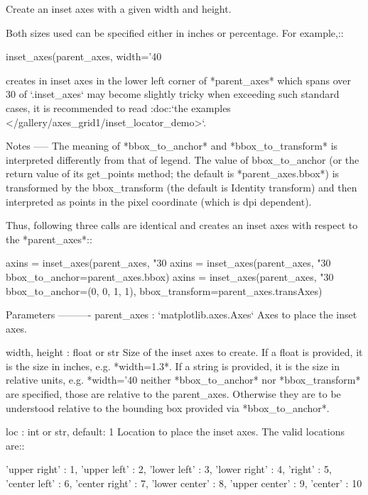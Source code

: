 \begin{DoxyVerb}Create an inset axes with a given width and height.

Both sizes used can be specified either in inches or percentage.
For example,::

    inset_axes(parent_axes, width='40%

creates in inset axes in the lower left corner of *parent_axes* which spans
over 30%
of `.inset_axes` may become slightly tricky when exceeding such standard
cases, it is recommended to read :doc:`the examples
</gallery/axes_grid1/inset_locator_demo>`.

Notes
-----
The meaning of *bbox_to_anchor* and *bbox_to_transform* is interpreted
differently from that of legend. The value of bbox_to_anchor
(or the return value of its get_points method; the default is
*parent_axes.bbox*) is transformed by the bbox_transform (the default
is Identity transform) and then interpreted as points in the pixel
coordinate (which is dpi dependent).

Thus, following three calls are identical and creates an inset axes
with respect to the *parent_axes*::

   axins = inset_axes(parent_axes, "30%
   axins = inset_axes(parent_axes, "30%
                      bbox_to_anchor=parent_axes.bbox)
   axins = inset_axes(parent_axes, "30%
                      bbox_to_anchor=(0, 0, 1, 1),
                      bbox_transform=parent_axes.transAxes)

Parameters
----------
parent_axes : `matplotlib.axes.Axes`
    Axes to place the inset axes.

width, height : float or str
    Size of the inset axes to create. If a float is provided, it is
    the size in inches, e.g. *width=1.3*. If a string is provided, it is
    the size in relative units, e.g. *width='40%
    neither *bbox_to_anchor* nor *bbox_transform* are specified, those
    are relative to the parent_axes. Otherwise they are to be understood
    relative to the bounding box provided via *bbox_to_anchor*.

loc : int or str, default: 1
    Location to place the inset axes. The valid locations are::

        'upper right'  : 1,
        'upper left'   : 2,
        'lower left'   : 3,
        'lower right'  : 4,
        'right'        : 5,
        'center left'  : 6,
        'center right' : 7,
        'lower center' : 8,
        'upper center' : 9,
        'center'       : 10


\end{DoxyVerb}
